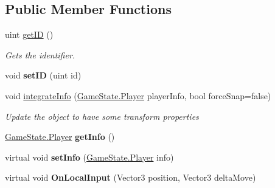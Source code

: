 \subsection*{Public Member Functions}
\begin{DoxyCompactItemize}
\item 
uint \hyperlink{class_player_reference_ae724ca461dddeed2f9671f9a745da381}{get\-I\-D} ()
\begin{DoxyCompactList}\small\item\em Gets the identifier. \end{DoxyCompactList}\item 
\hypertarget{class_player_reference_ae35eca907ad8238c4d51d65d8c021f26}{void {\bfseries set\-I\-D} (uint id)}\label{class_player_reference_ae35eca907ad8238c4d51d65d8c021f26}

\item 
void \hyperlink{class_player_reference_a4918fec4590780ff599dec4a5035bbbe}{integrate\-Info} (\hyperlink{struct_game_state_1_1_player}{Game\-State.\-Player} player\-Info, bool force\-Snap=false)
\begin{DoxyCompactList}\small\item\em Update the object to have some transform properties \end{DoxyCompactList}\item 
\hypertarget{class_player_reference_ab6b15f671b1553537a50db3529a74127}{\hyperlink{struct_game_state_1_1_player}{Game\-State.\-Player} {\bfseries get\-Info} ()}\label{class_player_reference_ab6b15f671b1553537a50db3529a74127}

\item 
\hypertarget{class_player_reference_aee764d4fed2e9c45ecdcfbf525bd03ed}{virtual void {\bfseries set\-Info} (\hyperlink{struct_game_state_1_1_player}{Game\-State.\-Player} info)}\label{class_player_reference_aee764d4fed2e9c45ecdcfbf525bd03ed}

\item 
\hypertarget{class_player_reference_aa8c16ecb182a8b2420158d87bdcdb510}{virtual void {\bfseries On\-Local\-Input} (Vector3 position, Vector3 delta\-Move)}\label{class_player_reference_aa8c16ecb182a8b2420158d87bdcdb510}

\end{DoxyCompactItemize}
